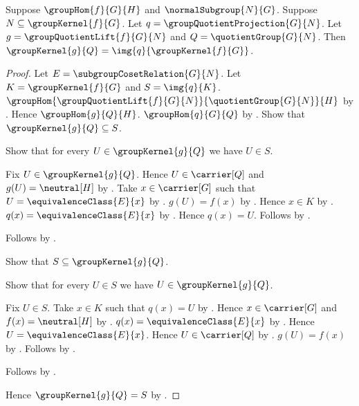\begin{theorem}\label{group_quotient_lift_kernel}
    Suppose $\groupHom{f}{G}{H}$ and $\normalSubgroup{N}{G}$.
    Suppose $N\subseteq\groupKernel{f}{G}$.
    Let $q=\groupQuotientProjection{G}{N}$.
    Let $g=\groupQuotientLift{f}{G}{N}$ and
        $Q=\quotientGroup{G}{N}$.
    Then
        $\groupKernel{g}{Q}=
            \img{q}{\groupKernel{f}{G}}$.
\end{theorem}
\begin{proof}
    Let $E=\subgroupCosetRelation{G}{N}$.
    Let $K=\groupKernel{f}{G}$ and
        $S=\img{q}{K}$.
    $\groupHom
        {\groupQuotientLift{f}{G}{N}}
        {\quotientGroup{G}{N}}{H}$ by
        .
    Hence $\groupHom{g}{Q}{H}$.
    $\groupHom{q}{G}{Q}$ by
        .
    Show that $\groupKernel{g}{Q}\subseteq S$.
    \begin{subproof}
        Show that for every $U\in\groupKernel{g}{Q}$ we have $U\in S$.
        \begin{subproof}
            Fix $U\in\groupKernel{g}{Q}$.
            Hence $U\in\carrier[Q]$ and $g(U)=\neutral[H]$ by
                .
            Take $x\in\carrier[G]$ such that
                $U=\equivalenceClass{E}{x}$ by
                .
            $g(U)=f(x)$ by
                .
            Hence $x\in K$ by .
            $q(x)=\equivalenceClass{E}{x}$ by
                .
            Hence $q(x)=U$.
            Follows by
                .
        \end{subproof}
        Follows by .
    \end{subproof}
    Show that $S\subseteq\groupKernel{g}{Q}$.
    \begin{subproof}
        Show that for every $U\in S$ we have
            $U\in\groupKernel{g}{Q}$.
        \begin{subproof}
            Fix $U\in S$.
            Take $x\in K$ such that $q(x)=U$ by
                .
            Hence $x\in\carrier[G]$ and $f(x)=\neutral[H]$ by
                .
            $q(x)=\equivalenceClass{E}{x}$ by
                .
            Hence $U=\equivalenceClass{E}{x}$.
            Hence $U\in\carrier[Q]$ by
                .
            $g(U)=f(x)$ by
                .
            Follows by .
        \end{subproof}
        Follows by .
    \end{subproof}
    Hence $\groupKernel{g}{Q}=S$ by
        .
\end{proof}

